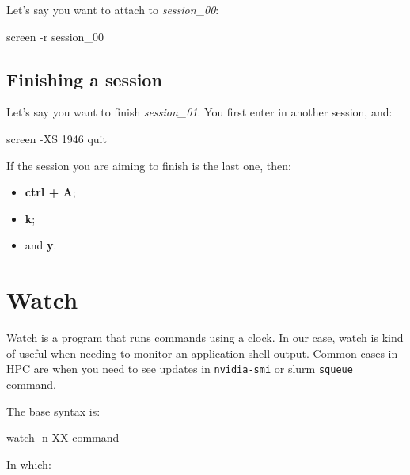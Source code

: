 \documentclass[
]{book}
\newenvironment{Shaded}{\begin{snugshade}}{\end{snugshade}}
\newcommand{\AttributeTok}[1]{\textcolor[rgb]{0.13,0.29,0.53}{#1}}
\newcommand{\ExtensionTok}[1]{#1}
\newcommand{\NormalTok}[1]{#1}
\providecommand{\tightlist}{%
  \setlength{\itemsep}{0pt}\setlength{\parskip}{0pt}}
\begin{document}
Let's say you want to attach to \emph{session\_00}:

\begin{Shaded}
\begin{Highlighting}[]
\ExtensionTok{screen} \AttributeTok{{-}r}\NormalTok{ session\_00}
\end{Highlighting}
\end{Shaded}

\hypertarget{finishing-a-session}{%
\subsection{Finishing a session}\label{finishing-a-session}}

Let's say you want to finish \emph{session\_01}. You first enter in another session, and:

\begin{Shaded}
\begin{Highlighting}[]
\ExtensionTok{screen} \AttributeTok{{-}XS}\NormalTok{ 1946 quit}
\end{Highlighting}
\end{Shaded}

If the session you are aiming to finish is the last one, then:

\begin{itemize}
\tightlist
\item
  \textbf{ctrl + A};
\item
  \textbf{k};
\item
  and \textbf{y}.
\end{itemize}

\hypertarget{watch}{%
\section{Watch}\label{watch}}

Watch is a program that runs commands using a clock. In our case, watch is kind
of useful when needing to monitor an application shell output. Common cases in HPC
are when you need to see updates in \texttt{nvidia-smi} or slurm \texttt{squeue} command.

The base syntax is:

\begin{Shaded}
\begin{Highlighting}[]
\ExtensionTok{watch} \AttributeTok{{-}n}\NormalTok{ XX command}
\end{Highlighting}
\end{Shaded}

In which:
\end{document}
